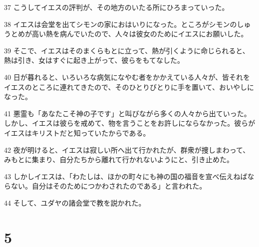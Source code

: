 \par 37 こうしてイエスの評判が、その地方のいたる所にひろまっていった。
\par 38 イエスは会堂を出てシモンの家におはいりになった。ところがシモンのしゅうとめが高い熱を病んでいたので、人々は彼女のためにイエスにお願いした。
\par 39 そこで、イエスはそのまくらもとに立って、熱が引くように命じられると、熱は引き、女はすぐに起き上がって、彼らをもてなした。
\par 40 日が暮れると、いろいろな病気になやむ者をかかえている人々が、皆それをイエスのところに連れてきたので、そのひとりびとりに手を置いて、おいやしになった。
\par 41 悪霊も「あなたこそ神の子です」と叫びながら多くの人々から出ていった。しかし、イエスは彼らを戒めて、物を言うことをお許しにならなかった。彼らがイエスはキリストだと知っていたからである。
\par 42 夜が明けると、イエスは寂しい所へ出て行かれたが、群衆が捜しまわって、みもとに集まり、自分たちから離れて行かれないようにと、引き止めた。
\par 43 しかしイエスは、「わたしは、ほかの町々にも神の国の福音を宣べ伝えねばならない。自分はそのためにつかわされたのである」と言われた。
\par 44 そして、ユダヤの諸会堂で教を説かれた。

\chapter{5}

